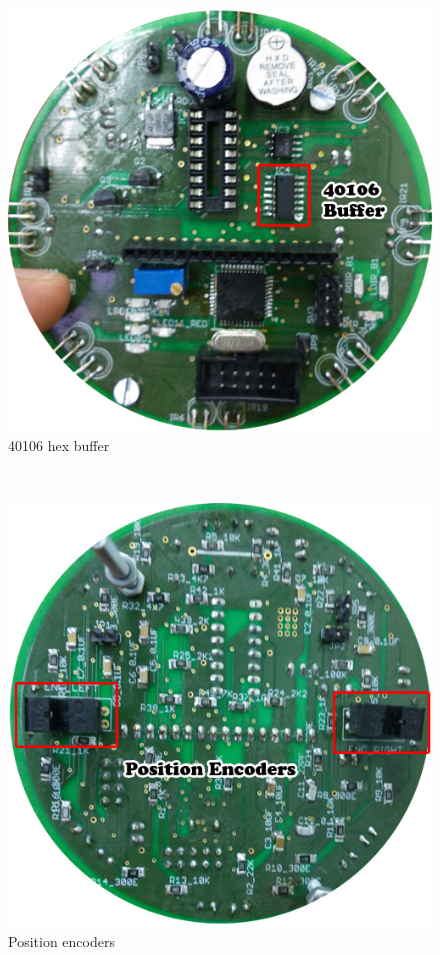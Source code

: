 \documentclass[a4paper,12pt,oneside]{book}
\begin{document}
	\hfill\\
	\begin{figure}[h!]
		\caption{40106 hex buffer}
		\includegraphics[width=\textwidth]{./HardwareManual/40106_buffer.jpg}
	\end{figure}

	\hfill\\
	\begin{figure}[h!]
		\caption{Position encoders}
		\includegraphics[width=\textwidth]{./HardwareManual/Position_encoders.jpg}
	\end{figure}
		
\end{document}
